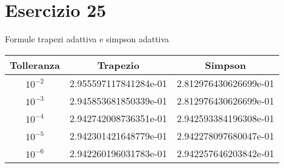 \section{Esercizio 25}
Formule trapezi adattiva e simpson adattiva
\begin{table}[ht]
	\centering
	\small
	\begin{tabular}{| c | c | c|}
	\hline
	Tolleranza & Trapezio & Simpson\\
	\hline
	$10^{-2}$ & 2.955597117841284e-01&2.812976430626699e-01\\
	\hline
	$10^{-3}$ &2.945853681850339e-01&2.812976430626699e-01\\
	\hline
	$10^{-4}$  &2.942742008736351e-01&2.942593384196308e-01\\
	\hline
	$10^{-5}$ &2.942301421648779e-01&2.942278097680047e-01\\
	\hline
	$10^{-6}$ &2.942260196031783e-01&2.942257646203842e-01\\
	\hline
	\end{tabular}
\end{table}

